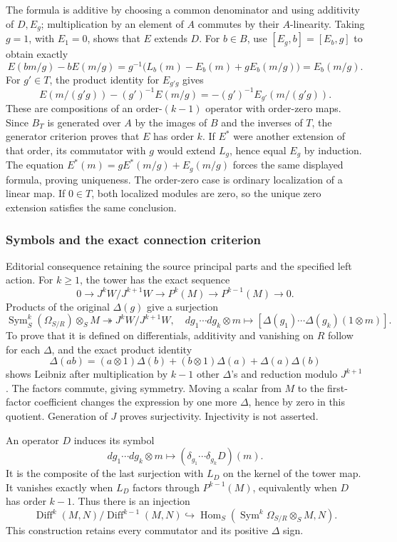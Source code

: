 The formula is additive by choosing a common denominator and using additivity of \(D,E_g\); multiplication by an element of \(A\) commutes by their \(A\)-linearity. Taking \(g=1\), with \(E_1=0\), shows that \(E\) extends \(D\). For \(b\in B\), use \([E_g,b]=[E_b,g]\) to obtain exactly \[
E(bm/g)-bE(m/g)
=g^{-1}\bigl(L_b(m)-E_b(m)+gE_b(m/g)\bigr)=E_b(m/g).
\] For \(g'\in T\), the product identity for \(E_{g'g}\) gives \[
E(m/(g'g))-(g')^{-1}E(m/g)=-(g')^{-1}E_{g'}(m/(g'g)).
\] These are compositions of an order-\((k-1)\) operator with order-zero maps. Since \(B_T\) is generated over \(A\) by the images of \(B\) and the inverses of \(T\), the generator criterion proves that \(E\) has order \(k\). If \(E^*\) were another extension of that order, its commutator with \(g\) would extend \(L_g\), hence equal \(E_g\) by induction. The equation \(E^*(m)=gE^*(m/g)+E_g(m/g)\) forces the same displayed formula, proving uniqueness. The order-zero case is ordinary localization of a linear map. If \(0\in T\), both localized modules are zero, so the unique zero extension satisfies the same conclusion.

\subsubsection{Symbols and the exact connection criterion}\label{symbols-and-the-exact-connection-criterion}

Editorial consequence retaining the source principal parts and the specified left action. For \(k\ge1\), the tower has the exact sequence \[
0\longrightarrow J^kW/J^{k+1}W\longrightarrow P^k(M)\longrightarrow P^{k-1}(M)\longrightarrow0.
\] Products of the original \(\Delta(g)\) give a surjection \[
\operatorname{Sym}^k_S(\Omega_{S/R})\otimes_SM\twoheadrightarrow J^kW/J^{k+1}W,
\quad dg_1\cdots dg_k\otimes m\longmapsto[\Delta(g_1)\cdots\Delta(g_k)(1\otimes m)].
\] To prove that it is defined on differentials, additivity and vanishing on \(R\) follow for each \(\Delta\), and the exact product identity \[
\Delta(ab)=(a\otimes1)\Delta(b)+(b\otimes1)\Delta(a)+\Delta(a)\Delta(b)
\] shows Leibniz after multiplication by \(k-1\) other \(\Delta\)'s and reduction modulo \(J^{k+1}\). The factors commute, giving symmetry. Moving a scalar from \(M\) to the first-factor coefficient changes the expression by one more \(\Delta\), hence by zero in this quotient. Generation of \(J\) proves surjectivity. Injectivity is not asserted.

An operator \(D\) induces its symbol \[
dg_1\cdots dg_k\otimes m\longmapsto(\delta_{g_1}\cdots\delta_{g_k}D)(m).
\] It is the composite of the last surjection with \(L_D\) on the kernel of the tower map. It vanishes exactly when \(L_D\) factors through \(P^{k-1}(M)\), equivalently when \(D\) has order \(k-1\). Thus there is an injection \[
\operatorname{Diff}^k(M,N)/\operatorname{Diff}^{k-1}(M,N)
\hookrightarrow\operatorname{Hom}_S(\operatorname{Sym}^k\Omega_{S/R}\otimes_SM,N).
\] This construction retains every commutator and its positive \(\Delta\) sign.

